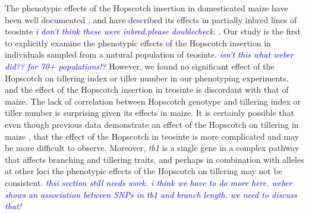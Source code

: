 \documentclass[12pt]{article}
\newcommand{\jri}[1]{\textcolor{blue}{ \emph{\scriptsize  #1}} }
\begin{document}
The phenotypic effects of the Hopscotch insertion in domesticated maize have been well documented \citep{Clark2006, Studer2011}, and \citet{Weber2007} have described its effects in partially inbred lines of teosinte \citep{Weber2007} \jri{i don't think these were inbred.please doublecheck.}. Our study is the first to explicitly examine the phenotypic effects of the Hopscotch insertion in individuals sampled from a natural population of teosinte. \jri{isn't this what weber did?? for 70+ populations!?} However, we found no significant effect of the Hopscotch on tillering index or tiller number in our phenotyping experiments, and the effect of the Hopscotch insertion in teosinte is discordant with that of maize. The lack of correlation between Hopscotch genotype and tillering index or tiller number is surprising given its effects in maize. It is certainly possible that even though previous data demonstrate an effect of the Hopscotch on tillering in maize \citep{Studer2011}, that the effect of the Hopscotch in teosinte is more complicated and may be more difficult to observe. Moreover, \emph{tb1} is a single gene in a complex pathway that affects branching and tillering traits, and perhaps in combination with alleles at other loci the phenotypic effects of the Hopscotch on tillering may not be consistent. \jri{thsi section still needs work. i think we have to do more here. weber shows an association between SNPs in tb1 and branch length. we need to discuss that!}
\end{document}
